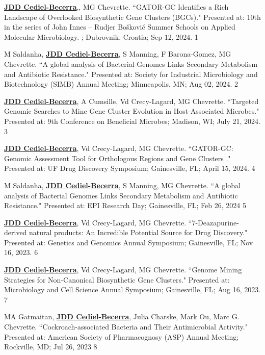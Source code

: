 \begin{cvpubs}


\cvpub
{\textbf{\underline{JDD Cediel-Becerra}},, MG Chevrette. ``GATOR-GC Identifies a Rich Landscape of Overlooked Biosynthetic Gene Clusters (BGCs)." Presented at: 10th in the series of John Innes – Rudjer Bošković Summer Schools on Applied Molecular Microbiology. ; Dubrovnik, Croatia; Sep 12, 2024.}
{1}

\cvpub
{M Saldanha, \textbf{\underline{JDD Cediel-Becerra}}, S Manning, F Barona-Gomez, MG Chevrette. ``A global analysis of Bacterial Genomes Links Secondary Metabolism and Antibiotic Resistance." Presented at: Society for Industrial Microbiology and Biotechnology (SIMB) Annual Meeting; Minneapolis, MN; Aug 02, 2024.}
{2}

\cvpub
{\textbf{\underline{JDD Cediel-Becerra}}, A Cumsille, Vd Crecy-Lagard, MG Chevrette. ``Targeted Genomic Searches to Mine Gene Cluster Evolution in Host-Associated Microbes." Presented at: 9th Conference on Beneficial Microbes; Madison, WI; July 21, 2024.}
{3}

\cvpub
{\textbf{\underline{JDD Cediel-Becerra}}, Vd Crecy-Lagard, MG Chevrette. ``GATOR-GC: Genomic Assessment Tool for Orthologous Regions and Gene Clusters ." Presented at: UF Drug Discovery Symposium; Gainesville, FL; April 15, 2024.}
{4}

\cvpub
{M Saldanha, \textbf{\underline{JDD Cediel-Becerra}}, S Manning, MG Chevrette. ``A global analysis of Bacterial Genomes Links Secondary Metabolism and Antibiotic Resistance." Presented at: EPI Research Day; Gainesville, FL; Feb 26, 2024}
{5}

\cvpub
{\textbf{\underline{JDD Cediel-Becerra}}, Vd Crecy-Lagard, MG Chevrette. ``7-Deazapurine-derived natural products: An Incredible Potential Source for Drug Discovery." Presented at: Genetics and Genomics Annual Symposium; Gainesville, FL; Nov 16, 2023.}
{6}

\cvpub
{\textbf{\underline{JDD Cediel-Becerra}}, Vd Crecy-Lagard, MG Chevrette. ``Genome Mining Strategies for Non-Canonical Biosynthetic Gene Clusters." Presented at: Microbiology and Cell Science Annual Symposium; Gainesville, FL; Aug 16, 2023.}
{7}

\cvpub
{MA Gatmaitan, \textbf{\underline{JDD Cediel-Becerra}}, Julia Charske, Mark Ou, Marc G. Chevrette. ``Cockroach-associated Bacteria and Their Antimicrobial Activity." Presented at: American Society of Pharmacognosy (ASP) Annual Meeting; Rockville, MD; Jul 26, 2023}
{8}


\end{cvpubs}
